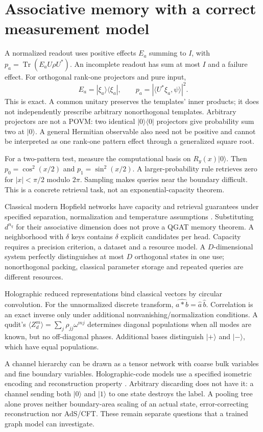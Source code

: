 \documentclass[11pt,oneside,openany]{book}
\theoremstyle{definition}\newtheorem{definition}[theorem]{Definition}
\theoremstyle{remark}\newtheorem{remark}[theorem]{Remark}
\begin{document}
\section{Associative memory with a correct measurement model}
A normalized readout uses positive effects $E_a$ summing to $I$, with
$p_a=\operatorname{Tr}(E_aU\rho U^*)$. An incomplete readout has sum at
most $I$ and a failure effect. For orthogonal rank-one projectors and pure
input,
\[
 E_a=|\xi_a\rangle\langle\xi_a|,\qquad
 p_a=|\langle U^*\xi_a,\psi\rangle|^2.
\]
This is exact. A common unitary preserves the templates' inner products;
it does not independently prescribe arbitrary nonorthogonal templates.
Arbitrary projectors are not a POVM: two identical $|0\rangle\langle0|$
projectors give probability sum two at $|0\rangle$. A general Hermitian
observable also need not be positive and cannot be interpreted as one
rank-one pattern effect through a generalized square root.

For a two-pattern test, measure the computational basis on $R_y(x)|0\rangle$.
Then $p_0=\cos^2(x/2)$ and $p_1=\sin^2(x/2)$. A larger-probability rule
retrieves zero for $|x|<\pi/2$ modulo $2\pi$. Sampling makes queries near
the boundary difficult. This is a concrete retrieval task, not an
exponential-capacity theorem.

Classical modern Hopfield networks have capacity and retrieval guarantees
under specified separation, normalization and temperature assumptions
\cite{PhysRamsauer}. Substituting $d^{n_q}$ for their associative dimension
does not prove a QGAT memory theorem. A neighborhood with $\delta$ keys
contains $\delta$ explicit candidates per head. Capacity requires a
precision criterion, a dataset and a resource model. A $D$-dimensional
system perfectly distinguishes at most $D$ orthogonal states in one use;
nonorthogonal packing, classical parameter storage and repeated queries
are different resources.

Holographic reduced representations bind classical vectors by circular
convolution. For the unnormalized discrete transform,
$\widehat{a*b}=\widehat a\,\widehat b$. Correlation is an exact inverse
only under additional nonvanishing/normalization conditions. A qudit's
$\langle Z_d^m\rangle=\sum_j\rho_{jj}\omega^{mj}$ determines diagonal
populations when all modes are known, but no off-diagonal phases. Additional
bases distinguish $|+\rangle$ and $|-\rangle$, which have equal populations.

A channel hierarchy can be drawn as a tensor network with coarse bulk
variables and fine boundary variables. Holographic-code models use a
specified isometric encoding and reconstruction property
\cite{PhysPastawski}. Arbitrary discarding does not have it: a channel
sending both $|0\rangle$ and $|1\rangle$ to one state destroys the label.
A pooling tree alone proves neither boundary-area scaling of an actual
state, error-correcting reconstruction nor AdS/CFT. These remain separate
questions that a trained graph model can investigate.
\end{document}
